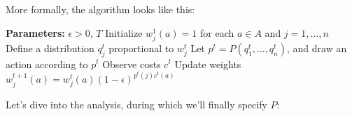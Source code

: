 \documentclass[12pt]{article}
\begin{document}
  More formally, the algorithm looks like this:
  \begin{algorithm}
    \begin{algorithmic}[0]
    \State \textbf{Parameters:} $\epsilon > 0$, $T$
    \State Initialize $w^1_j(a) = 1$ for each $a\in A$ and $j=1,\ldots,n$
        \State Define a distribution $q_j^t$ proportional to $w_j^t$
      \EndFor
      \State Let $p^t = P(q^t_1,\ldots,q^t_n)$, and 
        draw an action according to $p^t$
      \State Observe costs $c^t$
        \State Update weights $w^{t+1}_j(a) = w^t_j(a) (1 - \epsilon)^{p^t(j) c^t(a)}$
      \EndFor
    \EndFor
  \end{algorithmic}
  \end{algorithm}

  Let's dive into the analysis, during which we'll finally specify $P$:
\end{document}
